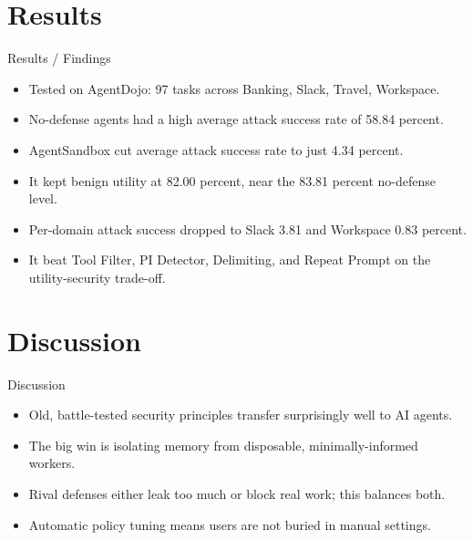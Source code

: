 \documentclass[10pt]{beamer}
\begin{document}
\section{Results}
\begin{frame}[allowframebreaks]{Results / Findings}
\begin{itemize}
  \item Tested on AgentDojo: 97 tasks across Banking, Slack, Travel, Workspace.
  \item No-defense agents had a high average attack success rate of 58.84 percent.
  \item AgentSandbox cut average attack success rate to just 4.34 percent.
  \item It kept benign utility at 82.00 percent, near the 83.81 percent no-defense level.
  \item Per-domain attack success dropped to Slack 3.81 and Workspace 0.83 percent.
  \item It beat Tool Filter, PI Detector, Delimiting, and Repeat Prompt on the utility-security trade-off.
\end{itemize}
\end{frame}
\section{Discussion}
\begin{frame}{Discussion}
\begin{itemize}
  \item Old, battle-tested security principles transfer surprisingly well to AI agents.
  \item The big win is isolating memory from disposable, minimally-informed workers.
  \item Rival defenses either leak too much or block real work; this balances both.
  \item Automatic policy tuning means users are not buried in manual settings.
\end{itemize}
\end{frame}
\end{document}
